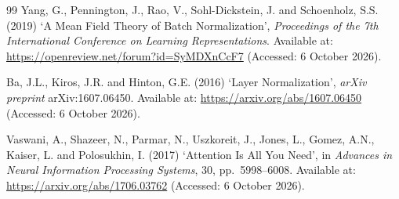 \documentclass[12pt]{article}
\begin{document}
\begin{thebibliography}{99}
Yang, G., Pennington, J., Rao, V., Sohl-Dickstein, J. and Schoenholz, S.S.
(2019) `A Mean Field Theory of Batch Normalization', \textit{Proceedings of
the 7th International Conference on Learning Representations}. Available at:
\url{https://openreview.net/forum?id=SyMDXnCcF7}
(Accessed: 6 October 2026).

Ba, J.L., Kiros, J.R. and Hinton, G.E. (2016) `Layer Normalization',
\textit{arXiv preprint} arXiv:1607.06450. Available at:
\url{https://arxiv.org/abs/1607.06450}
(Accessed: 6 October 2026).

Vaswani, A., Shazeer, N., Parmar, N., Uszkoreit, J., Jones, L., Gomez, A.N.,
Kaiser, L. and Polosukhin, I. (2017) `Attention Is All You Need', in
\textit{Advances in Neural Information Processing Systems}, 30,
pp.~5998--6008. Available at:
\url{https://arxiv.org/abs/1706.03762}
(Accessed: 6 October 2026).

\end{thebibliography}
\end{document}
